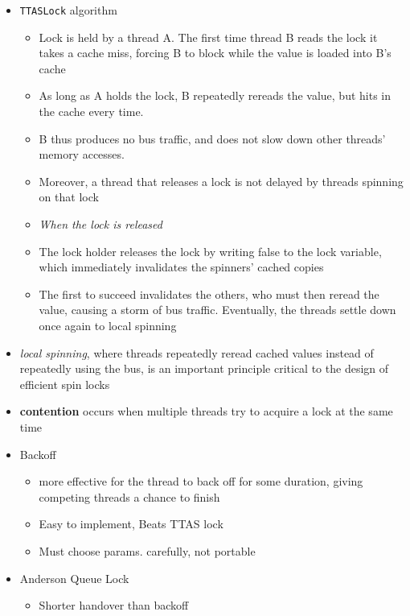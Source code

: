 \documentclass[12pt]{article}
\begin{document}
{\begin{itemize}
\begin{itemize}
\begin{itemize}
					\item When the thread holding the lock tries to release it, it may be delayed because the bus is monopolized by the spinners
				\end{itemize}
				\item \texttt{TTASLock} algorithm
				\begin{itemize}
					\item Lock is held by a thread A. The first time thread B reads the lock it takes a cache miss, forcing B to block while the value is loaded into B’s cache
					\item As long as A holds the lock, B repeatedly rereads the value, but hits in the cache every time. 
					\item B thus produces no bus traffic, and does not slow down other threads’ memory accesses.
					\item Moreover, a thread that releases a lock is not delayed by threads spinning on that lock
					\item \textit{When the lock is released}
					\item The lock holder releases the lock by writing false to the lock variable, which immediately invalidates the spinners’ cached copies
					\item The first to succeed invalidates the others, who must then reread the value,
					causing a storm of bus traffic. Eventually, the threads settle down once again to
					local spinning
				\end{itemize}
				\item \textit{local spinning}, where threads repeatedly reread cached values
				instead of repeatedly using the bus, is an important principle critical to the design
				of efficient spin locks
				\item \textbf{contention} occurs when multiple threads try to acquire a lock at the same time
				\item Backoff
				\begin{itemize}
					\item more effective for the thread to back off for some duration, giving competing threads a chance to finish
					\item Easy to implement, Beats TTAS lock
					\item Must choose params. carefully, not portable
				\end{itemize}
				\item Anderson Queue Lock
				\begin{itemize}
					\item Shorter handover than backoff

\end{itemize}
\end{itemize}
\end{itemize}}
\end{document}
